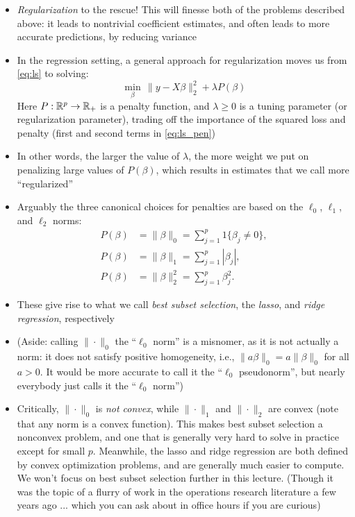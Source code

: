 \documentclass{article}
\begin{document}
\begin{itemize}
\item \emph{Regularization} to the rescue! This will finesse both of the
  problems described above: it leads to nontrivial coefficient estimates, and
  often leads to more accurate predictions, by reducing variance  

\item In the regression setting, a general approach for regularization moves us 
  from \eqref{eq:ls} to solving:
  \begin{equation}
  \label{eq:ls_pen}
  \min_\beta \, \|y - X\beta\|_2^2 + \lambda P(\beta)
  \end{equation}
  Here $P : \mathbb{R}^p \to \mathbb{R}_+$ is a penalty function, and $\lambda \geq 0$ is a
  tuning parameter (or regularization parameter), trading off the importance
  of the squared loss and penalty (first and second terms in \eqref{eq:ls_pen}) 

\item In other words, the larger the value of $\lambda$, the more weight we put
  on penalizing large values of $P(\beta)$, which results in estimates that we
  call more ``regularized''   

\item Arguably the three canonical choices for penalties are based on the
  $\ell_0$, $\ell_1$, and $\ell_2$ norms:   
  \begin{align*}
  P(\beta) &= \|\beta\|_0 = \sum_{j=1}^p 1\{\beta_j \not= 0\}, \\
  P(\beta) &= \|\beta\|_1 = \sum_{j=1}^p |\beta_j|, \\
  P(\beta) &= \|\beta\|_2^2 = \sum_{j=1}^p \beta_j^2.
  \end{align*}

\item These give rise to what we call \emph{best subset selection}, the
  \emph{lasso}, and \emph{ridge regression}, respectively  

\item (Aside: calling $\|\cdot\|_0$ the ``$\ell_0$ norm'' is a misnomer, as it
  is not actually a norm: it does not satisfy positive homogeneity, i.e.,
  $\|a\beta\|_0 = a\|\beta\|_0$ for all $a>0$. It would be more accurate to
  call it the ``$\ell_0$ pseudonorm'', but nearly everybody just calls it the
  ``$\ell_0$ norm'')

\item Critically, $\|\cdot\|_0$ is \emph{not convex}, while $\|\cdot\|_1$ and 
  $\|\cdot\|_2$ are convex (note that any norm is a convex function). This makes
  best subset selection a nonconvex problem, and one that is generally very hard
  to solve in practice except for small $p$. Meanwhile, the lasso and ridge
  regression are both defined by convex optimization problems, and are generally
  much easier to compute. We won't focus on best subset selection further in
  this lecture. (Though it was the topic of a flurry of work in the operations
  research literature a few years ago ... which you can ask about in office
  hours if you are curious)   


\end{itemize}
\end{document}
